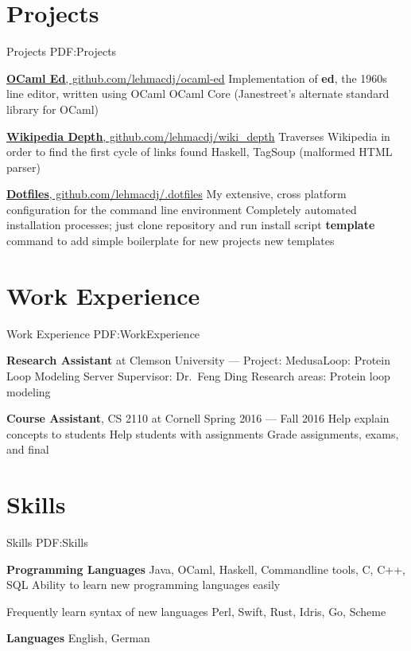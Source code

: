 \documentclass[letterpaper,10pt,oneside]{simpleresume}
\begin{document}
\begin{minipage}[t][0pt]{\linewidth}
\begin{body}
\section%
{Projects}
{Projects}
{PDF:Projects}

\href{https://www.github.com/lehmacdj/ocaml-ed}
{\textbf{OCaml Ed}, github.com/lehmacdj/ocaml-ed}
\BulletItem%
Implementation of \textbf{ed}, the 1960s line editor, written using OCaml
\BulletItem%
OCaml Core (Janestreet's alternate standard library for OCaml)

\href{https://www.github.com/lehmacdj/wiki_depth}
{\textbf{Wikipedia Depth}, github.com/lehmacdj/wiki\_depth}
\BulletItem%
Traverses Wikipedia in order to find the first cycle of links found
\BulletItem%
Haskell, TagSoup (malformed HTML parser)

\href{https://www.github.com/lehmacdj/.dotfiles}
{\textbf{Dotfiles}, github.com/lehmacdj/.dotfiles}
\BulletItem%
My extensive, cross platform configuration for the command line environment
\BulletItem%
Completely automated installation processes; just clone repository and run
install script
\BulletItem%
\textbf{template} command to add simple boilerplate for new projects
new templates

\section%
{Work Experience}
{Work Experience}
{PDF:WorkExperience}

\textbf{Research Assistant} at Clemson University
\hfill
{} --- 
\BulletItem%
Project:
MedusaLoop: Protein Loop Modeling Server
\BulletItem%
Supervisor:
Dr.\ Feng Ding
\BulletItem%
Research areas:
Protein loop modeling

\textbf{Course Assistant}, CS 2110 at Cornell
\hfill
Spring 2016 --- Fall 2016
\BulletItem%
Help explain concepts to students
\BulletItem%
Help students with assignments
\BulletItem%
Grade assignments, exams, and final

\section%
{Skills}
{Skills}
{PDF:Skills}

\textbf{Programming Languages}
\BulletItem%
Java, OCaml, Haskell, Commandline tools, C, C++, SQL
\BulletItem%
Ability to learn new programming languages easily
\begin{detail}
\SubBulletItem%
Frequently learn syntax of new languages
\SubBulletItem%
Perl, Swift, Rust, Idris, Go, Scheme
\end{detail}
\textbf{Languages}
\BulletItem%
English, German
\end{body}

\end{minipage}
\end{document}
